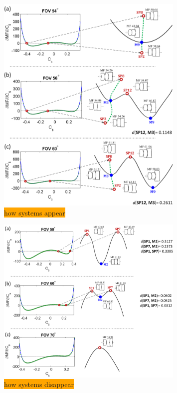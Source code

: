 \begin{figure}[h!]
    \centering
    \includegraphics[width=0.8\textwidth]{chapter-3/figures/SystemBorn.png}
    \caption{\colorbox{orange}{how systems appear}}
    \label{fig:systemborn}
\end{figure}

\begin{figure}[h!]
    \centering
    \includegraphics[width=0.8\textwidth]{chapter-3/figures/SystemDie.png}
    \caption{\colorbox{orange}{how systems disappear}}
    \label{fig:systemdie}
\end{figure}

